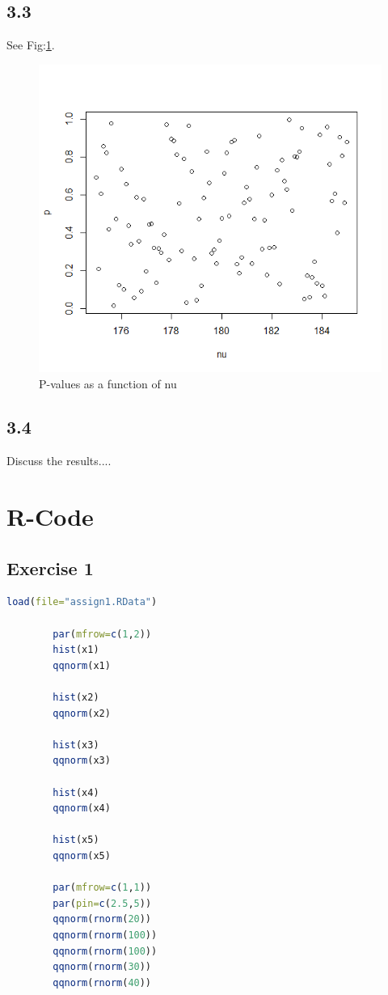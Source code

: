 \documentclass{article}
\begin{document}
    \subsection{3.3}
      See Fig:\ref{fig:3_3}.
      \begin{figure}
        \centering
        \includegraphics[width=.8\linewidth]{results/3_3}
        \caption{P-values as a function of nu}
        \label{fig:3_3}
      \end{figure}

    \subsection{3.4}
      Discuss the results....

  \section{R-Code}
    \subsection{Exercise 1}\label{sub:R1}
      \begin{lstlisting}[language=R]
        load(file="assign1.RData")

        par(mfrow=c(1,2))
        hist(x1)
        qqnorm(x1)

        hist(x2)
        qqnorm(x2)

        hist(x3)
        qqnorm(x3)

        hist(x4)
        qqnorm(x4)

        hist(x5)
        qqnorm(x5)

        par(mfrow=c(1,1))
        par(pin=c(2.5,5))
        qqnorm(rnorm(20))
        qqnorm(rnorm(100))
        qqnorm(rnorm(100))
        qqnorm(rnorm(30))
        qqnorm(rnorm(40))
      \end{lstlisting}
\end{document}
